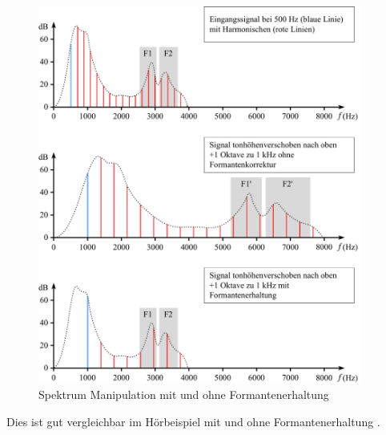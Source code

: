 \begin{figure}
    \centering
    \includegraphics[width=0.95\textwidth]{papers/autotune/images/Formanten-Erhaltung.pdf}
    \caption{Spektrum Manipulation mit und ohne Formantenerhaltung}
    \label{autotune:fig:formantenErhaltung}
\end{figure}
Dies ist gut vergleichbar im Hörbeispiel mit \cite{autotune:audioExamplePitchShiftingWithFormantPreservation} und ohne Formantenerhaltung \cite{autotune:audioExamplePitchShiftingWithoutFormantPreservation}.

